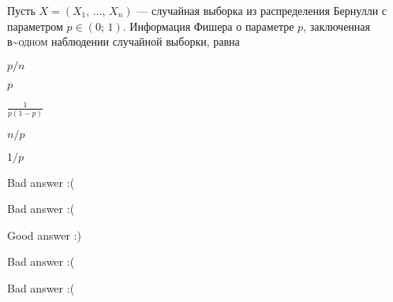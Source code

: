 
\begin{question}
Пусть \(X = (X_1, \, \ldots, \, X_n)\) — случайная выборка из
распределения Бернулли с параметром \(p \in (0;\,1)\). Информация Фишера
о параметре \(p\), заключенная в\textasciitilde{}\textsc{одном}
наблюдении случайной выборки, равна
\begin{answerlist}
  \item \(p/n\)
  \item \(p\)
  \item \(\frac{1}{p(1-p)}\)
  \item \(n/p\)
  \item \(1/p\)
\end{answerlist}
\end{question}

\begin{solution}
\begin{answerlist}
  \item Bad answer :(
  \item Bad answer :(
  \item Good answer :)
  \item Bad answer :(
  \item Bad answer :(
\end{answerlist}
\end{solution}

